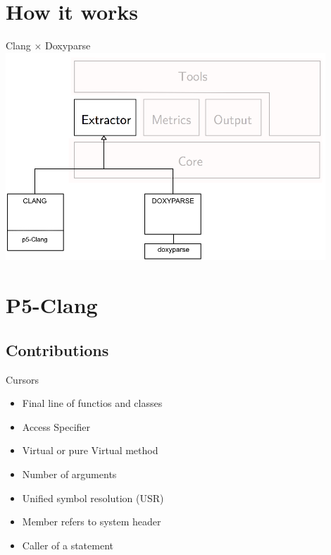 
\section{How it works} %
\label{sec:how_it_works}

\begin{frame}{Clang $\times$ Doxyparse}
    \centering
        \includegraphics[width=0.9\textwidth]{conteudo/how_it_works.png}
\end{frame}

\section{P5-Clang} %
\label{sec:p5_clang}

\subsection*{Contributions}
\begin{frame}{Cursors}
    \begin{itemize} 
        \item Final line of functios and classes  
        \item Access Specifier
        \item Virtual or pure Virtual method
        \item Number of arguments
        \item Unified symbol resolution (USR)
        \item Member refers to system header
        \item Caller of a statement 
    \end{itemize}
\end{frame}

